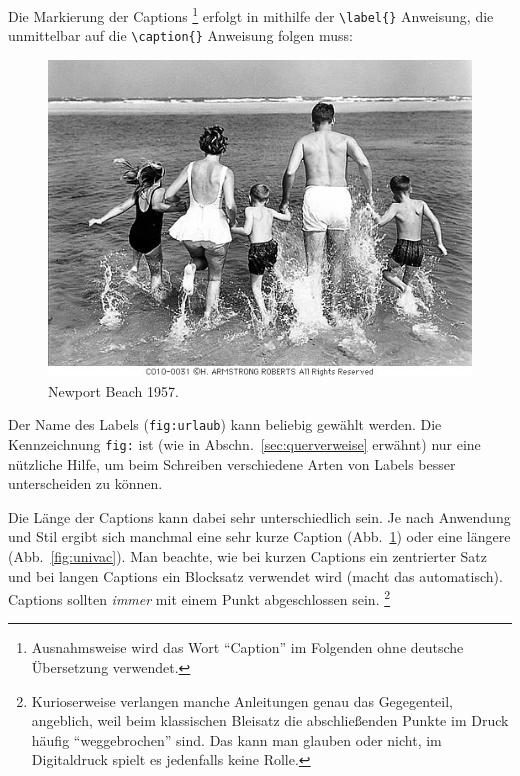 Die Markierung der Captions%
\footnote{Ausnahmsweise wird das Wort "`Caption"' im Folgenden
ohne deutsche Übersetzung verwendet.} erfolgt in \latex mithilfe
der \verb!\label{}! Anweisung, die unmittelbar auf die
\verb!\caption{}! Anweisung folgen muss:
%
\begin{LaTeXCode}
\begin{figure}
\centering
\includegraphics[width=.85\textwidth]{CS0031}
\caption{Newport Beach 1957.}
\label{fig:urlaub}
\end{figure}
\end{LaTeXCode}
%
Der Name des Labels (\texttt{fig:urlaub}) kann beliebig gewählt werden. 
Die Kennzeichnung \texttt{fig:} ist (wie in Abschn.\ \ref{sec:querverweise} 
erwähnt) nur eine nützliche Hilfe, um beim Schreiben verschiedene Arten 
von Labels besser unterscheiden zu können.

Die Länge der Captions kann dabei sehr unterschiedlich sein. Je
nach Anwendung und Stil ergibt sich manchmal eine sehr kurze
Caption (Abb.~\ref{fig:urlaub}) oder eine längere
(Abb.~\ref{fig:univac}).
Man beachte, wie bei kurzen Captions ein
zentrierter Satz und bei langen Captions ein Blocksatz verwendet
wird (\latex macht das automatisch).
Captions sollten \emph{immer} mit einem Punkt abgeschlossen sein.%
\footnote{Kurioserweise verlangen manche Anleitungen
genau das Gegegenteil, angeblich, weil beim klassischen Bleisatz 
die abschließenden Punkte im Druck häufig "`weggebrochen"' sind. 
Das kann man glauben oder nicht, im Digitaldruck 
spielt es jedenfalls keine Rolle.}

